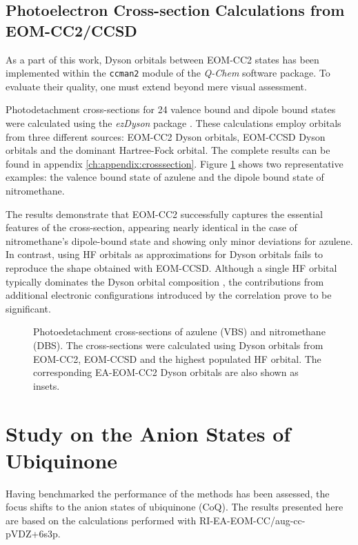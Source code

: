 \subsection{Photoelectron Cross-section Calculations from EOM-CC2/CCSD}

As a part of this work, Dyson orbitals between EOM-CC2 states has been implemented within the \texttt{ccman2} module of the \textit{Q-Chem} software package. To evaluate their quality, one must extend beyond mere visual assessment.

Photodetachment cross-sections for 24 valence bound and dipole bound states were calculated using the \textit{ezDyson} package \cite{gozem2022ezspectra,gozem2015photoionization}. These calculations employ orbitals from three different sources: EOM-CC2 Dyson orbitals, EOM-CCSD Dyson orbitals and the dominant Hartree-Fock orbital. The complete results can be found in appendix \ref{ch:appendix:crosssection}. Figure \ref{fig:ezDyson} shows two representative examples: the valence bound state of azulene and the dipole bound state of nitromethane.

The results demonstrate  that EOM-CC2 successfully captures the essential features of the cross-section, appearing nearly identical in the case of nitromethane's dipole-bound state and showing only minor deviations for azulene. In contrast, using HF orbitals as approximations for Dyson orbitals fails to reproduce the shape obtained with EOM-CCSD. Although a single HF orbital typically dominates the Dyson orbital composition \cite{diaz2019dyson}, the contributions from additional electronic configurations introduced by the correlation prove to be significant.

\begin{figure}[th!]
    \centering
    \small
    
    \caption[Photoedetachment Crossections.]{ Photoedetachment cross-sections of azulene (VBS) and nitromethane (DBS). The cross-sections were calculated using Dyson orbitals from EOM-CC2, EOM-CCSD and the highest populated HF orbital. The corresponding EA-EOM-CC2 Dyson orbitals are also shown as insets.}
    \label{fig:ezDyson}
\end{figure}

\section{Study on the Anion States of Ubiquinone}

Having benchmarked the performance of the methods has been assessed, the focus shifts to the anion states of ubiquinone (CoQ). The results presented here are based on the calculations performed with RI-EA-EOM-CC/aug-cc-pVDZ+6s3p.

